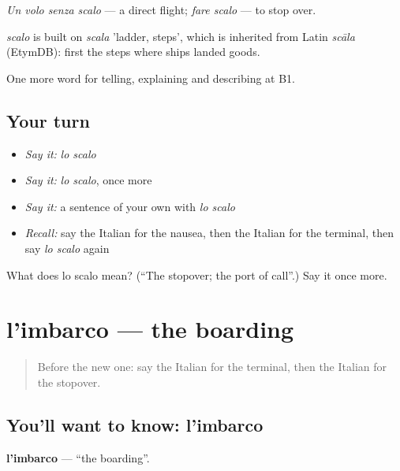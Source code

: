 \emph{Un volo senza scalo} — a direct flight; \emph{fare scalo} — to stop over.

\begin{cousinweb}
\emph{scalo} is built on \emph{scala} 'ladder, steps', which is inherited from Latin \emph{scāla} (EtymDB): first the steps where ships landed goods.
\end{cousinweb}

\begin{grammarlens}[title={What you've built}]
One more word for telling, explaining and describing at B1.
\end{grammarlens}

\subsection*{Your turn}
\begin{itemize}
\raggedright
  \item \emph{Say it:} \emph{lo scalo}
  \item \emph{Say it:} \emph{lo scalo}, once more
  \item \emph{Say it:} a sentence of your own with \emph{lo scalo}
  \item \emph{Recall:} say the Italian for the nausea, then the Italian for the terminal, then say \emph{lo scalo} again
\end{itemize}

\begin{tcolorbox}[breakable,colback=teal!4,colframe=teal!35!black,title={Before you move on}]
What does lo scalo mean? (\textquotedblleft{}The stopover; the port of call\textquotedblright{}.) Say it once more.
\end{tcolorbox}
\section[l'imbarco]{l'imbarco — the boarding}

\label{lesson:IT-C425-imbarco}



\begin{quote}
Before the new one: say the Italian for the terminal, then the Italian for the stopover.
\end{quote}

\subsection*{You'll want to know: l'imbarco}
\textbf{l'imbarco} — \textquotedblleft{}the boarding\textquotedblright{}.

